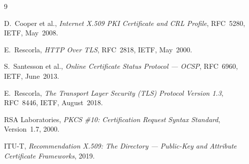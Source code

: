 \documentclass[10pt,twocolumn]{article}
\begin{document}
\begin{thebibliography}{9}

D.~Cooper et al.,
\textit{Internet X.509 PKI Certificate and CRL Profile},
RFC~5280, IETF, May~2008.

E.~Rescorla,
\textit{HTTP Over TLS},
RFC~2818, IETF, May~2000.

S.~Santesson et al.,
\textit{Online Certificate Status Protocol --- OCSP},
RFC~6960, IETF, June~2013.

E.~Rescorla,
\textit{The Transport Layer Security (TLS) Protocol Version 1.3},
RFC~8446, IETF, August~2018.

RSA Laboratories,
\textit{PKCS \#10: Certification Request Syntax Standard},
Version~1.7, 2000.

ITU-T,
\textit{Recommendation X.509: The Directory --- Public-Key and
Attribute Certificate Frameworks}, 2019.

\end{thebibliography}
\end{document}
